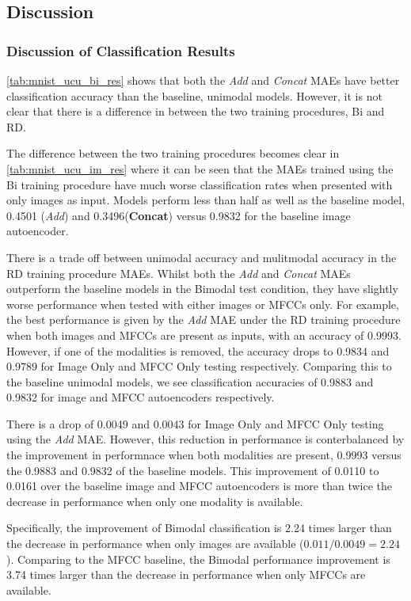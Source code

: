 \subsection{Discussion}

\subsubsection{Discussion of Classification Results}
\autoref{tab:mnist_ucu_bi_res} shows that both the \textit{Add} and \textit{Concat} MAEs have better classification accuracy than the baseline, unimodal models. However, it is not clear that there is a difference in between the two training procedures, Bi and RD.

The difference between the two training procedures becomes clear in \autoref{tab:mnist_ucu_im_res} where it can be seen that the MAEs trained using the Bi training procedure have much worse classification rates when presented with only images as input. Models perform less than half as well as the baseline model, 0.4501 (\textit{Add}) and 0.3496(\textbf{Concat}) versus 0.9832 for the baseline image autoencoder.

There is a trade off between unimodal accuracy and mulitmodal accuracy in the RD training procedure MAEs. Whilst both the \textit{Add} and \textit{Concat} MAEs outperform the baseline models in the Bimodal test condition, they have slightly worse performance when tested with either images or MFCCs only. For example, the best performance is given by the \textit{Add} MAE under the RD training procedure when both images and MFCCs are present as inputs, with an accuracy of 0.9993. However, if one of the modalities is removed, the accuracy drops to 0.9834 and 0.9789 for Image Only and MFCC Only testing respectively. Comparing this to the baseline unimodal models, we see classification accuracies of 0.9883 and 0.9832 for image and MFCC autoencoders respectively. 

There is a drop of 0.0049 and 0.0043 for Image Only and MFCC Only testing using the \textit{Add} MAE. However, this reduction in performance is conterbalanced by the improvement in performnace when both modalities are present, 0.9993 versus the 0.9883 and 0.9832 of the baseline models. This improvement of 0.0110 to 0.0161 over the baseline image and MFCC autoencoders is more than twice the decrease in performance when only one modality is available. 

Specifically, the improvement of Bimodal classification is 2.24 times larger than the decrease in performance when only images are available ($0.011 / 0.0049 = 2.24$). Comparing to the MFCC baseline, the Bimodal performance improvement is 3.74 times larger than the decrease in performance when only MFCCs are available.

